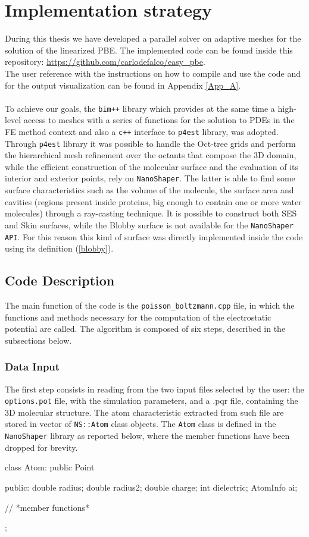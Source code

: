 \documentclass[11pt,a4paper]{article}
\begin{document}
\section{Implementation strategy}
\label{sec:implementation}
During this thesis we have developed a parallel solver on adaptive meshes for the solution of the linearized PBE. The implemented code can be found inside this repository: \url{https://github.com/carlodefalco/easy_pbe}. \\
The user reference with the instructions on how to compile and use the code and for the output visualization can be found in Appendix \ref{App_A}. \\\\
To achieve our goals, the \texttt{bim++} library which provides at the same time a high-level access to meshes with a series of functions for the solution to PDEs in the FE method context and also a \texttt{c++} interface to \texttt{p4est} library, was adopted. Through \texttt{p4est} library it was possible to handle the Oct-tree grids and perform the hierarchical mesh refinement over the octants that compose the 3D domain, while the efficient construction of the molecular surface and the evaluation of its interior and exterior points, rely on \texttt{NanoShaper}. The latter is able to find some surface characteristics such as the volume of the molecule, the surface area and cavities (regions present inside proteins, big enough to contain one or more water molecules) through a ray-casting technique. It is possible to construct both SES and Skin surfaces, while the Blobby surface is not available for the \texttt{NanoShaper API}. For this reason this kind of surface was directly implemented inside the code using its definition (\ref{blobby}). 

\subsection{Code Description}
The main function of the code is the \texttt{poisson\_boltzmann.cpp} file, in which the functions and methods necessary for the computation of the electrostatic potential are called. The algorithm is composed of six steps, described in the subsections below.
\subsubsection{Data Input}
The first step consists in reading from the two input files selected by the user: the \texttt{options.pot} file, with the simulation parameters, and a .pqr file, containing the 3D molecular structure. The atom characteristic extracted from such file are stored in vector of \texttt{NS::Atom} class objects. The \texttt{Atom} class is defined in the \texttt{NanoShaper} library as reported below, where the member functions have been dropped for brevity. 
\begin{code}
class Atom: public Point
{
public:
	double radius;
	double radius2;
	double charge;
	int dielectric;
	AtomInfo ai;
	
	// *member functions*
};
\end{code}
\end{document}
